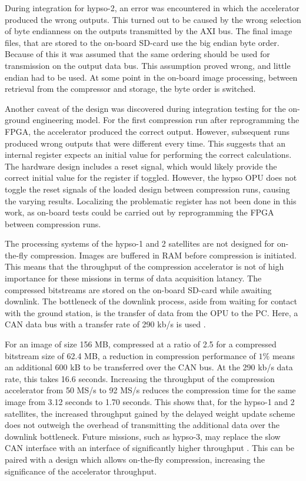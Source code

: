 During integration for \acrshort{hypso}-2, an error was encountered in which the accelerator produced the wrong outputs. This turned out to be caused by the wrong selection of byte endianness on the outputs transmitted by the \acrshort{AXI} bus. The final image files, that are stored to the on-board SD-card use the big endian byte order. Because of this it was assumed that the same ordering should be used for transmission on the output data bus. This assumption proved wrong, and little endian had to be used. At some point in the on-board image processing, between retrieval from the compressor and storage, the byte order is switched.

Another caveat of the design was discovered during integration testing for the on-ground engineering model. For the first compression run after reprogramming the \acrshort{FPGA}, the accelerator produced the correct output. However, subsequent runs produced wrong outputs that were different every time. This suggests that an internal register expects an initial value for performing the correct calculations. The hardware design includes a reset signal, which would likely provide the correct initial value for the register if toggled. However, the \acrshort{hypso} \acrshort{OPU} does not toggle the reset signals of the loaded design between compression runs, causing the varying results. Localizing the problematic register has not been done in this work, as on-board tests could be carried out by reprogramming the \acrshort{FPGA} between compression runs.

The processing systems of the \acrshort{hypso}-1 and 2 satellites are not designed for on-the-fly compression. Images are buffered in \acrshort{RAM} before compression is initiated. This means that the throughput of the compression accelerator is not of high importance for these missions in terms of data acquisition latancy. The compressed bitstreams are stored on the on-board SD-card while awaiting downlink. The bottleneck of the downlink process, aside from waiting for contact with the ground station, is the transfer of data from the \acrshort{OPU} to the \acrshort{PC}. Here, a \acrfull{CAN} data bus with a transfer rate of 290 kb/s is used \cite{grotteOceanColorHyperspectral2022}.

For an image of size 156 MB, compressed at a ratio of 2.5 for a compressed bitstream size of 62.4 MB, a reduction in compression performance of $1\%$ means an additional 600 kB to be transferred over the \acrshort{CAN} bus. At the 290 kb/s data rate, this takes 16.6 seconds. Increasing the throughput of the compression accelerator from 50 MS/s to 92 MS/s reduces the compression time for the same image from 3.12 seconds to 1.70 seconds. This shows that, for the \acrshort{hypso}-1 and 2 satellites, the increased throughput gained by the delayed weight update scheme does not outweigh the overhead of transmitting the additional data over the downlink bottleneck. Future missions, such as \acrshort{hypso}-3, may replace the slow \acrshort{CAN} interface with an interface of significantly higher throughput \cite{grotteOceanColorHyperspectral2022}. This can be paired with a design which allows on-the-fly compression, increasing the significance of the accelerator throughput.

